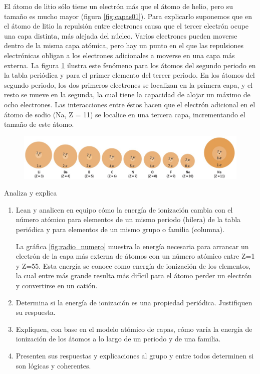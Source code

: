 \documentclass[11pt]{book}
\begin{document}
El átomo de litio sólo tiene un electrón más que el átomo de helio, pero su tamaño es mucho mayor (figura \ref{fig:capas01}).
Para explicarlo suponemos que en el átomo de litio la repulsión entre electrones causa que el tercer electrón ocupe una capa
distinta, más alejada del núcleo. Varios electrones pueden moverse dentro de la misma capa atómica, pero hay un punto en
el que las repulsiones electrónicas obligan a los electrones adicionales a moverse en una capa más externa.
La figura \ref{fig:capas02} ilustra este fenómeno para los átomos del segundo periodo en la tabla periódica y
para el primer elemento del tercer periodo. En los átomos del segundo periodo, los dos primeros electrones se
localizan en la primera capa, y el resto se mueve en la segunda, la cual tiene la capacidad de alojar un máximo
de ocho electrones. Las interacciones entre éstos hacen que el electrón adicional en el átomo de sodio (Na, Z = 11)
se localice en una tercera capa, incrementando el tamaño de este átomo.

\begin{figure}[H]
  \centering
  \includegraphics[width=0.9\linewidth]{capas02.jpg}
  \label{fig:capas02}
\end{figure}%

\begin{boxK}
  Analiza y explica
  \begin{enumerate}
    \item Lean y analicen en equipo cómo la energía de ionización cambia con el número atómico para elementos de un
          mismo periodo (hilera) de la tabla periódica y para elementos de un mismo grupo o familia (columna).

          \begin{boxF}
            La gráfica \ref{fig:radio_numero} muestra la energía necesaria para arrancar un electrón de la capa más
            externa de átomos
            con un número atómico entre Z=1 y Z=55. Esta energía se conoce como energía de ionización de los
            elementos, la cual entre más grande resulta más difícil para el átomo perder un electrón y convertirse en un catión.
          \end{boxF}

    \item Determina si la energía de ionización es una propiedad periódica. Justifiquen su respuesta.
    \item Expliquen, con base en el modelo atómico de capas, cómo varía la energía de ionización de los átomos a
          lo largo de un periodo y de una familia.
    \item Presenten sus respuestas y explicaciones al grupo y entre todos determinen si son lógicas y coherentes.
  \end{enumerate}
\end{boxK}
\newpage
\end{document}

